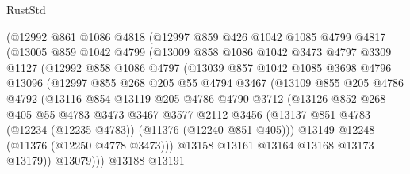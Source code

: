\begin{lexlean}{RustStd}
\begin{coremodule}
{{{{{{{{{{{{{{{{{{{            (@12992
              @861
              @1086
              @4818
              (@12997
                @859
                @426
                @1042
                @1085
                @4799
                @4817
                (@13005
                  @859
                  @1042
                  @4799
                  (@13009
                    @858
                    @1086
                    @1042
                    @3473
                    @4797
                    @3309
                    @1127
                    (@12992
                      @858
                      @1086
                      @4797
                      (@13039
                        @857
                        @1042
                        @1085
                        @3698
                        @4796
                        @13096
                        (@12997
                          @855
                          @268
                          @205
                          @55
                          @4794
                          @3467
                          (@13109
                            @855
                            @205
                            @4786
                            @4792
                            (@13116
                              @854
                              @13119
                              @205
                              @4786
                              @4790
                              @3712
                              (@13126
                                @852
                                @268
                                @405
                                @55
                                @4783
                                @3473
                                @3467
                                @3577
                                @2112
                                @3456
                                (@13137
                                  @851
                                  @4783
                                  (@12234 (@12235 @4783))
                                  (@11376 (@12240 @851 @405)))
                                @13149
                                @12248
                                (@11376 (@12250 @4778 @3473)))
                              @13158
                              @13161
                              @13164
                              @13168
                              @13173
                              @13179))
                          @13079)))
                    @13188
                    @13191
}}}}}}}}}}}}}}}}}}}
\end{coremodule}
\end{lexlean}
